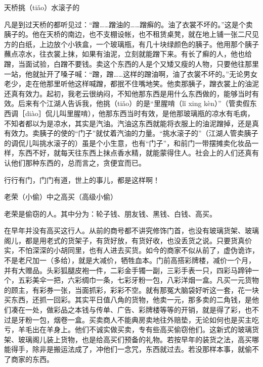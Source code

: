 \documentclass[12pt,UTF8]{ctexbook}
\begin{document}
天桥挑（tiǎo）水滚子的


凡是到过天桥的都听见过：“蹭……蹭油的……蹭癣的。油了衣裳不坏的。”这是个卖胰子的。他在天桥的南边，也不支棚设帐，也不租赁桌凳，就在地上铺一张二尺见方的白纸，上边放个小铁盒，一个玻璃瓶，有几十块绿颜色的胰子。他用那个胰子蘸点凉水，往衣裳上抹，如果有油泥，立刻就能蹭下来。有长了癣的人，他也给蹭，当面试验，白蹭不要钱。卖这个东西的人是个又矮又瘦的人物，只要他往那里一站，他就扯开了嗓子喊：“蹭，蹭……这样的蹭油啊，油了衣裳不坏的。”无论男女老少，走在他那里听他这样喊蹭，都抿不住嘴地笑。他卖那胰子，蹭衣裳上的油泥还真有效力。起初，我老云很纳闷，不知他那东西是用什么东西做的，能够当时有效。后来有个江湖人告诉我，他挑（tiǎo）的是“里腥啃（lǐ xing kèn）”（管卖假东西调［diào］侃儿叫里腥啃），他那东西当时有效，是他那玻璃瓶的凉水有毛病，不知者都以为是凉水，其实是汽油。汽油这东西就能将衣服上的油泥蹭掉，还是真有效力。卖胰子的使的“门子”就仗着汽油的力量。“挑水滚子的”（江湖人管卖胰子的调侃儿叫挑水滚子的）虽是个小生意，也有“门子”，和前门一带摆摊卖化妆品一样，东西不好，就每天往东西上抹点香水精，就能蒙得住人。社会上的人们还真有认他们那种东西的，总而言之，贪便宜而已。

行行有门，门门有道，世上的事儿，都是这样啊！





老荣（小偷）中之高买（高级小偷）


老荣是偷窃的人。其中分为：轮子钱、朋友钱、黑钱、白钱、高买。

在早年并没有高买这行人。从前的商号都不讲究修饰门首，也没有玻璃货架、玻璃阁儿，都是用老式的货架子，有货好放，有货好收，也没丢货之说。只要货真价实，不怕深深的小胡同里，也有人进去买货。如今的商家不似从前了，虚伪诡诈，不是老尺加一（多给），就是大减价，牺牲血本。门前高搭彩牌楼，减价一个月，并有大赠品。头彩狐腿皮袍一件，二彩金手镯一副，三彩手表一只，四彩马蹄钟一个，五彩美伞一把，六彩绸巾一条，七彩牙粉一包，八彩洋烟一盒。凡买一元货物的顾主，有彩券一张，当面抓彩，彩彩不空。就有那冤大脑袋好听这一套，花一块买东西，还抓一回彩。其实平日值八角的货物，他卖一元，那多卖的二角钱，是他们凑在一处，做彩品之本钱与传单、广告、彩牌楼等等的开销，就是得了彩，也不过是牙粉一包，烟卷一盒。买卖商人不能典房卖地往外赔垫，无论如何也是买主吃亏，羊毛出在羊身上。他们不诚实做买卖，专有些高买偷窃他们。这新式的玻璃货架、玻璃阁儿装上货物，也是给高买们预备的礼物。若按早年的装货之法，高买哪能得手，除非是搬运法成了，冲他们一念咒，东西就过去。若没那样本事，就偷不了商家的东西。
\end{document}

